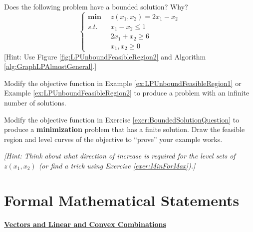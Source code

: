 \begin{exercise}{}{} Does the following problem have a bounded solution? Why?
\begin{equation}
\left\{
\begin{aligned}
\boldsymbol{\min}\;\;& z(x_1,x_2) = 2x_1 - x_2\\
s.t.\;\;& x_1 - x_2 \leq 1\\
& 2x_1 + x_2 \geq 6\\
&x_1,x_2 \geq 0
\end{aligned}
\right.
\end{equation}
[Hint: Use Figure \ref{fig:LPUnboundFeasibleRegion2} and Algorithm \ref{alg:GraphLPAlmostGeneral}.]
\label{exer:BoundedSolutionQuestion}
\end{exercise}

\begin{exercise}{}{} Modify the objective function in Example \ref{ex:LPUnboundFeasibleRegion1} or Example \ref{ex:LPUnboundFeasibleRegion2} to produce a problem with an infinite number of solutions. 
\end{exercise}

\begin{exercise}{}{} Modify the objective function in Exercise \ref{exer:BoundedSolutionQuestion} to produce a \textbf{minimization} problem that has a finite solution. Draw the feasible region and level curves of the objective to ``prove'' your example works. 

\emph{[Hint: Think about what direction of increase is required for the level sets of $z(x_1,x_2)$ (or find a trick using Exercise \ref{exer:MinForMax}).]}
\end{exercise}

\section{Formal Mathematical Statements}
\underline{\bf Vectors and Linear and Convex Combinations} \\

